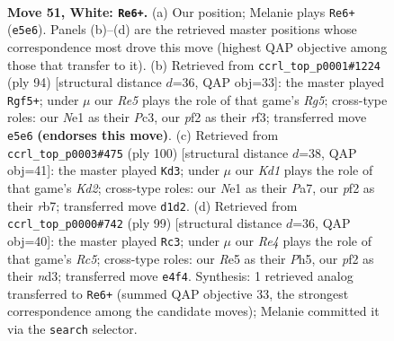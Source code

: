 \documentclass[11pt]{article}
\begin{document}
\clearpage

\begin{figure}[p]\centering
\begin{subfigure}{0.46\textwidth}\centering
\resizebox{\linewidth}{!}{%
\newchessgame
\chessboard[
  setfen={8/8/7k/2p1R2P/4R3/8/1P3p2/3KN2r w - - 3 51},
  showmover=false,
  pgfstyle=straightmove, color=movearrow, markmove={e5-e6}
]}
\caption{}
\end{subfigure}\hfill
\begin{subfigure}{0.46\textwidth}\centering
\resizebox{\linewidth}{!}{%
\newchessgame
\chessboard[
  setfen={5k2/6p1/8/3pR1RP/2r5/2P2r2/2K5/8 w - - 2 48},
  showmover=false,
  pgfstyle=straightmove, color=movearrow, markmove={g5-f5}
]}
\caption{}
\end{subfigure}
\\[4pt]
\begin{subfigure}{0.46\textwidth}\centering
\resizebox{\linewidth}{!}{%
\newchessgame
\chessboard[
  setfen={r7/Pr6/8/R3pk2/3p4/R4P2/3K4/8 w - - 0 51},
  showmover=false,
  pgfstyle=straightmove, color=movearrow, markmove={d2-d3}
]}
\caption{}
\end{subfigure}\hfill
\begin{subfigure}{0.46\textwidth}\centering
\resizebox{\linewidth}{!}{%
\newchessgame
\chessboard[
  setfen={8/8/8/R1nk3p/p1r5/P2NK2P/8/8 b - - 3 50},
  showmover=false,
  pgfstyle=straightmove, color=movearrow, markmove={c4-c3}
]}
\caption{}
\end{subfigure}
\caption{\textbf{Move 51, White: \texttt{Re6+}.} (a) Our position; Melanie plays \texttt{Re6+} (\texttt{e5e6}). Panels (b)--(d) are the retrieved master positions whose correspondence most drove this move (highest QAP objective among those that transfer to it). (b) Retrieved from \texttt{ccrl\_top\_p0001\#1224} (ply 94) [structural distance $d$=36, QAP obj=33]: the master played \texttt{Rgf5+}; under $\mu$ our \emph{Re5} plays the role of that game's \emph{Rg5}; cross-type roles: our \emph{N}e1 as their \emph{P}c3, our \emph{p}f2 as their \emph{r}f3; transferred move \texttt{e5e6} \textbf{(endorses this move)}. (c) Retrieved from \texttt{ccrl\_top\_p0003\#475} (ply 100) [structural distance $d$=38, QAP obj=41]: the master played \texttt{Kd3}; under $\mu$ our \emph{Kd1} plays the role of that game's \emph{Kd2}; cross-type roles: our \emph{N}e1 as their \emph{P}a7, our \emph{p}f2 as their \emph{r}b7; transferred move \texttt{d1d2}. (d) Retrieved from \texttt{ccrl\_top\_p0000\#742} (ply 99) [structural distance $d$=36, QAP obj=40]: the master played \texttt{Rc3}; under $\mu$ our \emph{Re4} plays the role of that game's \emph{Rc5}; cross-type roles: our \emph{R}e5 as their \emph{P}h5, our \emph{p}f2 as their \emph{n}d3; transferred move \texttt{e4f4}. Synthesis: 1 retrieved analog transferred to \texttt{Re6+} (summed QAP objective 33, the strongest correspondence among the candidate moves); Melanie committed it via the \texttt{search} selector.}
\label{fig:thought-m100}
\end{figure}
\end{document}
